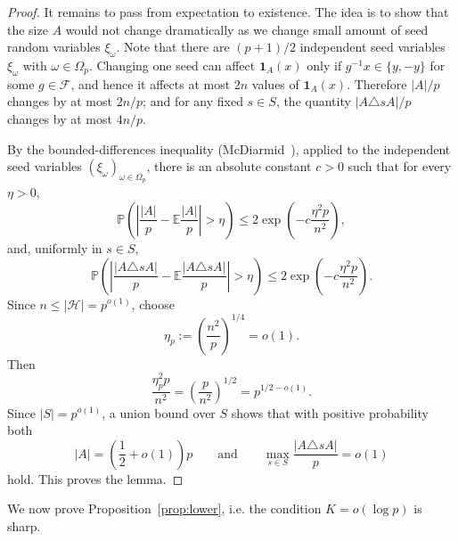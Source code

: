 \documentclass[11pt,letterpaper,reqno]{amsart}
\theoremstyle{definition}
\newcommand{\E}{\mathbb E}
\newcommand{\1}{\mathbf 1}
\begin{document}
\begin{proof}
It remains to pass from expectation to existence. The idea is to show that the size $A$ would not change dramatically as we change small amount of seed random variables $\xi_{\omega}$. Note
that there are $(p+1)/2$
independent seed variables $\xi_{\omega}$ with $\omega\in\Omega_p$.  Changing one seed can affect $\1_A(x)$ only if
$g^{-1}x\in\{y,-y\}$ for some $g\in\mathcal F$, and hence it affects at most
$2n$ values of $\1_A(x)$.  Therefore $|A|/p$ changes by at most $2n/p$; and for any fixed
$s\in S$, the quantity $|A\triangle sA|/p$ changes by at most $4n/p$.


By the bounded-differences inequality
(McDiarmid~\cite[Lemma~(1.2)]{McDiarmid}), applied to the independent seed
variables \((\xi_\omega)_{\omega\in\Omega_p}\), there is an absolute constant
\(c>0\) such that for every \(\eta>0\),
\[
    \mathbb P\left(\left|\frac{|A|}{p}-\E\frac{|A|}{p}\right|>\eta\right)
    \le 2\exp\left(-c\frac{\eta^2p}{n^2}\right),
\]
and, uniformly in \(s\in S\),
\[
    \mathbb P\left(\left|\frac{|A\triangle sA|}{p}
    -\E\frac{|A\triangle sA|}{p}\right|>\eta\right)
    \le 2\exp\left(-c\frac{\eta^2p}{n^2}\right).
\]
Since $n\le|\mathcal H|=p^{o(1)}$, choose
\[
        \eta_p:=\left(\frac{n^2}{p}\right)^{1/4}=o(1).
\]
Then
\[
        \frac{\eta_p^2p}{n^2}
        =\left(\frac{p}{n^2}\right)^{1/2}=p^{1/2-o(1)}.
\]
Since $|S|=p^{o(1)}$, a union bound over $S$ shows that with positive
probability both
\[
        |A|=\left(\frac12+o(1)\right)p \qquad \text{and} \qquad \max_{s\in S}\frac{|A\triangle sA|}{p}=o(1)
\]
hold.  This proves the lemma.
\end{proof}













We now prove Proposition~\ref{prop:lower}, i.e. the condition $K=o(\log p)$ is sharp.
\end{document}
